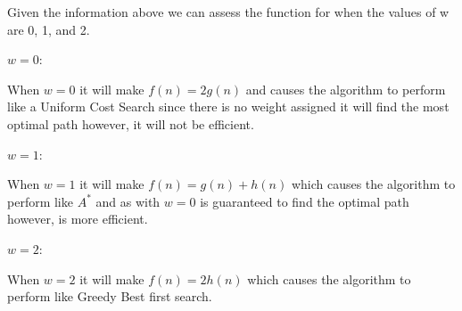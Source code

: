\documentclass[10pt,a4paper]{article}
\begin{document}
\begin{itemize}
		Given the information above we can assess the function for when the values of w are 0, 1, and 2.
		
		$w = 0$:
		
		When $w = 0$ it will make $f(n) = 2g(n)$ and causes the algorithm to perform like a Uniform Cost Search since there is no weight assigned it will find the most optimal path however, it will not be efficient.
		
		$w = 1$:

		When $w = 1$ it will make $f(n) = g(n) + h(n)$ which causes the algorithm to perform like $A^*$ and as with $w=0$ is guaranteed to find the optimal path however, is more efficient.
		
		$w = 2$: 
		
		When $w = 2$ it will make $f(n) = 2h(n)$ which causes the algorithm to perform like Greedy Best first search.
		
	\end{itemize}
		
\end{document}
